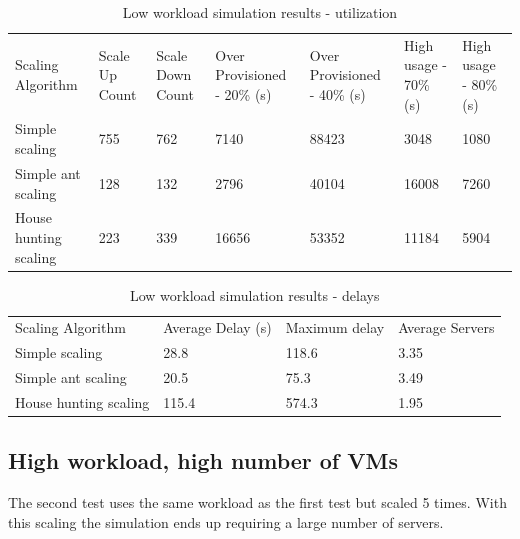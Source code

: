 \documentclass[conference]{IEEEtran}
\begin{document}
\begin{table}
\caption{Low workload simulation results - utilization}
\label{table:sim1}
\begin{tabu} to\linewidth{|X[c]|X[c]|X[c]|X[c]|X[c]|X[c]|X[c]|}
\everyrow{\hline}
\hline
Scaling Algorithm & Scale Up Count & Scale Down Count & Over Provisioned - 20\% (s) & Over Provisioned - 40\% (s) & High usage - 70\% (s) & High usage - 80\% (s) \\
Simple scaling & 755 & 762 & 7140 & 88423 & 3048 & 1080 \\
Simple ant scaling & 128 & 132 & 2796 & 40104 & 16008 & 7260 \\
House hunting scaling & 223 & 339 & 16656 & 53352 & 11184 & 5904 \\
\end{tabu}
\end{table}

\begin{table}
\caption{Low workload simulation results - delays}
\label{table:sim1-delay}
\begin{tabu} to\linewidth{|X[c]|X[c]|X[c]|X[c]|}
\everyrow{\hline}
\hline
Scaling Algorithm & Average Delay (s) & Maximum delay & Average Servers  \\
Simple scaling & 28.8 & 118.6 & 3.35 \\
Simple ant scaling & 20.5 & 75.3 & 3.49 \\
House hunting scaling & 115.4 & 574.3 & 1.95 \\
\end{tabu}
\end{table}

\subsection{High workload, high number of VMs}

The second test uses the same workload as the first test but scaled 5 times. With this scaling the simulation ends up requiring a large number of servers.
\end{document}
